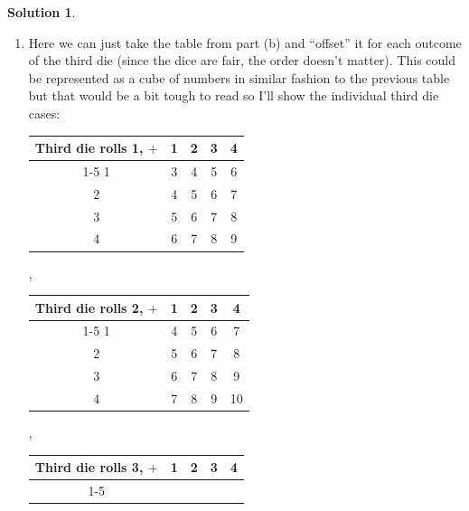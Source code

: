 \documentclass[10pt]{article}
\theoremstyle{definition}
\newtheorem{soln}{Solution}
\begin{document}
\begin{soln}
\begin{enumerate}[label=(\alph*)]
          \begin{center}
          \end{center}
    \item Here we can just take the table from part (b) and ``offset'' it for each outcome of the third die (since the dice are fair, the order doesn't matter).
          This could be represented as a cube of numbers in similar fashion to the previous table but that would be a bit tough to read so I'll show the individual
          third die cases:
          \begin{center}
            \begin{tabular}{c | c c c c}
              Third die rolls 1, $+$ & 1 & 2 & 3 & 4 \\
              \cline{1-5}
              1                      & 3 & 4 & 5 & 6 \\
              2                      & 4 & 5 & 6 & 7 \\
              3                      & 5 & 6 & 7 & 8 \\
              4                      & 6 & 7 & 8 & 9 \\
            \end{tabular},
            \begin{tabular}{c | c c c c}
              Third die rolls 2, $+$ & 1 & 2 & 3 & 4  \\
              \cline{1-5}
              1                      & 4 & 5 & 6 & 7  \\
              2                      & 5 & 6 & 7 & 8  \\
              3                      & 6 & 7 & 8 & 9  \\
              4                      & 7 & 8 & 9 & 10 \\
            \end{tabular},
            \begin{tabular}{c | c c c c}
              Third die rolls 3, $+$ & 1 & 2 & 3  & 4  \\
              \cline{1-5}

\end{tabular}
\end{center}
\end{enumerate}
\end{soln}
\end{document}
